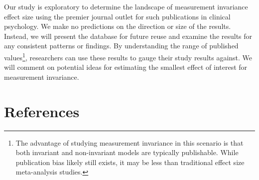 \documentclass[
  man]{apa7}
\begin{document}
Our study is exploratory to determine the landscape of measurement invariance effect size using the premier journal outlet for such publications in clinical psychology. We make no predictions on the direction or size of the results. Instead, we will present the database for future reuse and examine the results for any consistent patterns or findings. By understanding the range of published values\footnote{The advantage of studying measurement invariance in this scenario is that both invariant and non-invariant models are typically publishable. While publication bias likely still exists, it may be less than traditional effect size meta-analysis studies.}, researchers can use these results to gauge their study results against. We will comment on potential ideas for estimating the smallest effect of interest for measurement invariance.

\newpage

\hypertarget{references}{%
\section{References}\label{references}}
\end{document}
